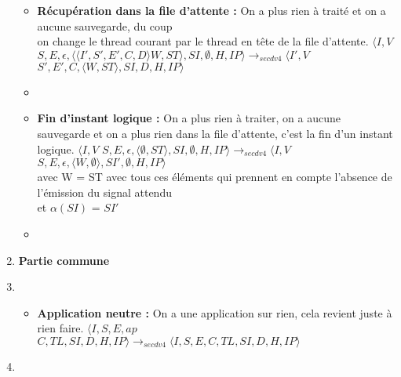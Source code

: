 \documentclass[10pt,a4paper]{article}
\begin{document}
\begin{enumerate}
\begin{itemize}
			    	\item[] \textbf{Récupération dans la file d'attente :} On a plus rien à traité et on a aucune sauvegarde, du coup 
			    	\\on change le thread courant par le thread en tête de la file d'attente.
			    	\smallbreak
			    	$\langle I,V$ $S,E,\epsilon,\langle\langle I',S',E',C,D\rangle W,ST\rangle,SI,\emptyset,H,IP\rangle 
			    	\longrightarrow_{secdv4} \langle I',V$ $S',E',C,\langle W,ST\rangle,SI,D,H,IP\rangle$
			    	\item[]
			    	
			    	\item[] \textbf{Fin d'instant logique :} On a plus rien à traiter, on a aucune sauvegarde et on a plus rien dans la file d'attente, c'est la fin d'un instant logique.
			    	\smallbreak
			    	$\langle I,V$ $S,E,\epsilon,\langle\emptyset,ST\rangle,SI,\emptyset,H,IP\rangle 
			    	\longrightarrow_{secdv4} \langle I,V$ $S,E,\epsilon,\langle W,\emptyset\rangle,SI',\emptyset,H,IP\rangle$\\
			    	avec W = ST avec tous ces éléments qui prennent en compte l'absence de l'émission du signal attendu
			    	\\et  $\alpha(SI)$ = $SI'$ 
			    	\item[]
			    	
		    	\end{itemize}
			    \item[] \textbf{Partie commune} 
			   	\item[]
			   	\begin{itemize}
			   		\item[] \textbf{Application neutre :} On a une application sur rien, cela revient juste à rien faire.
			     	\smallbreak 
			     	$\langle I,S,E,ap$ $C,TL,SI,D,H,IP\rangle
			   		\longrightarrow_{secdv4} \langle I,S,E,C,TL,SI,D,H,IP\rangle$
			   	\end{itemize}
			    
				\item[]
			\end{enumerate}
			\bigbreak
			\bigbreak
			
\end{document}
